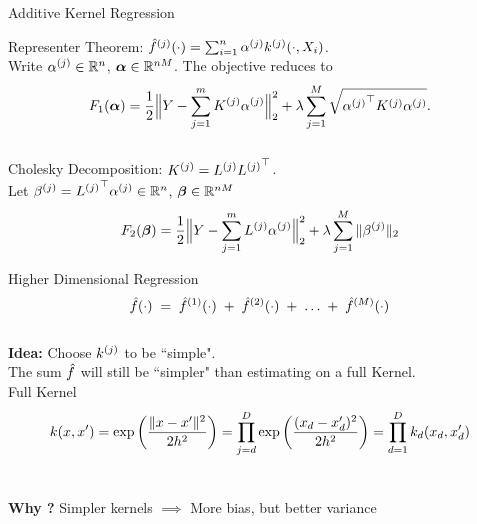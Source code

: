 \begin{frame}{Additive Kernel Regression}

Representer Theorem: $\hat{f}^{(j)}(\cdot) = \sum_{i=1}^n {\alpha^{(j)}}
k^{(j)}(\cdot,X_i)$. \\[0.2in]
\pause
Write ${\alpha^{(j)}} \in \mathbb{R}^n$, ${\bm{\alpha}} \in \mathbb{R}^{nM}$. The objective reduces to
\begin{equation*}
F_1({\bm{\alpha}}) = \frac{1}{2}\Big\|Y - \sum_{j=1}^m {K^{(j)}} {\alpha^{(j)}}\Big\|_2^2 + 
  \lambda \sum_{j=1}^M \sqrt{{{\alpha^{(j)}}}^\top {K^{(j)}} {\alpha^{(j)}}}.
\end{equation*} \\
\pause
\vspace{0.2in}
Cholesky Decomposition: ${K^{(j)}} = {L^{(j)}} {L^{(j)}}^\top$. \\ 
Let ${\beta^{(j)}} = {L^{(j)}}^\top {\alpha^{(j)}} \in \mathbb{R}^n$, ${\bm{\beta}} \in \mathbb{R}^{nM}$
\begin{equation*}
F_2({\bm{\beta}}) =  \frac{1}{2}\Big\|Y - \sum_{j=1}^m {L^{(j)}} {\alpha^{(j)}}\Big\|_2^2 + 
  \lambda \sum_{j=1}^M \|{\beta^{(j)}}\|_2
\end{equation*}

\end{frame}



\begin{frame}{Higher Dimensional Regression}
  \[
    \hat{f}(\cdot) \;=\; \hat{f}^{(1)}(\cdot)\; +\;  
      \hat{f}^{(2)}(\cdot)\;+\;\dots \;+\; \hat{f}^{(M)}(\cdot)
  \] \\
\vspace{0.2in}
\pause
\textbf{Idea:} Choose $k^{(j)}$ to be ``simple".  \\
The sum $\hat{f}$ will still be
``simpler" than estimating on a full Kernel.\\
\pause
\vspace{0.2in}
Full Kernel
\[
k(x,x') = \exp\left( \frac{\|x-x'\|^2}{2h^2} \right)
= \prod_{j=d}^D \exp\left( \frac{(x_d-x_d')^2}{2h^2} \right)
= \prod_{d=1}^D k_d(x_d, x'_d)
\]\\
\vspace{0.2in}
\pause

\textbf{Why ?} Simpler kernels $\implies$ More bias, but better variance 


\end{frame}



